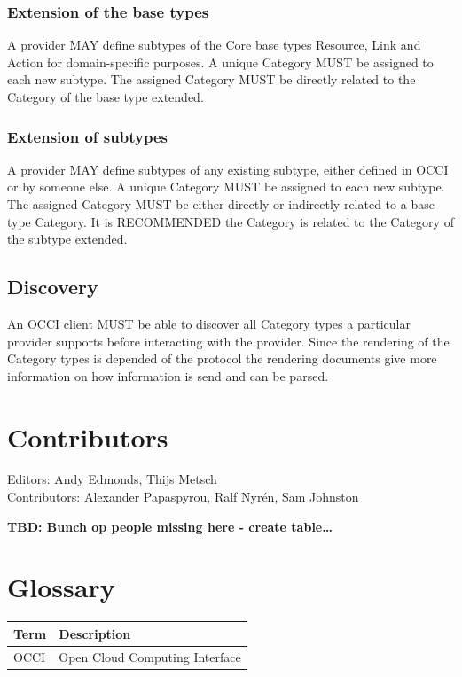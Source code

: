 \documentclass[10pt,a4paper]{article}
\begin{document}
\subsubsection{Extension of the base types}
A provider MAY define subtypes of the Core base types Resource, Link
and Action for domain-specific purposes. A unique Category MUST be
assigned to each new subtype. The assigned Category MUST be directly
related to the Category of the base type extended.

\subsubsection{Extension of subtypes}
A provider MAY define subtypes of any existing subtype, either defined
in OCCI or by someone else. A unique Category MUST be assigned to each
new subtype. The assigned Category MUST be either directly or
indirectly related to a base type Category. It is RECOMMENDED the
Category is related to the Category of the subtype extended.

\subsection{Discovery}
An OCCI client MUST be able to discover all Category types a
particular provider supports before interacting with the
provider. Since the rendering of the Category types is depended of the
protocol the rendering documents give more information on how
information is send and can be parsed.

\section{Contributors}
Editors: Andy Edmonds, Thijs Metsch \\
Contributors: Alexander Papaspyrou, Ralf Nyrén, Sam Johnston

\textbf{TBD: Bunch op people missing here - create table\ldots}

\section{Glossary}

\begin{tabular}{l|l}
Term & Description \\
\hline
OCCI & Open Cloud Computing Interface \\
\end{tabular}
\end{document}
